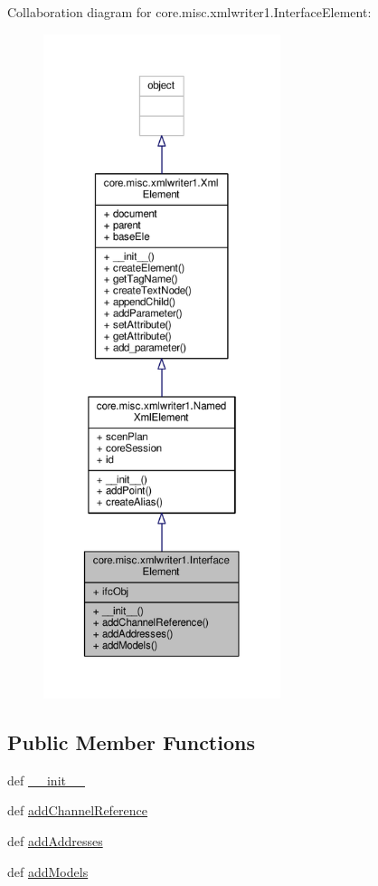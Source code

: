 Collaboration diagram for core.\+misc.\+xmlwriter1.\+Interface\+Element\+:
\nopagebreak
\begin{figure}[H]
\begin{center}
\leavevmode
\includegraphics[height=550pt]{classcore_1_1misc_1_1xmlwriter1_1_1_interface_element__coll__graph}
\end{center}
\end{figure}
\subsection*{Public Member Functions}
\begin{DoxyCompactItemize}
\item 
def \hyperlink{classcore_1_1misc_1_1xmlwriter1_1_1_interface_element_a885c247fff48860d434ee4d40b125051}{\+\_\+\+\_\+init\+\_\+\+\_\+}
\item 
def \hyperlink{classcore_1_1misc_1_1xmlwriter1_1_1_interface_element_a0c2b64eadffb4d64de4dc15d86716aec}{add\+Channel\+Reference}
\item 
def \hyperlink{classcore_1_1misc_1_1xmlwriter1_1_1_interface_element_a01e91c0537d32772721789d4502b2080}{add\+Addresses}
\item 
def \hyperlink{classcore_1_1misc_1_1xmlwriter1_1_1_interface_element_a0a6c21d055f00e62e65467a33520b5d3}{add\+Models}
\end{DoxyCompactItemize}
